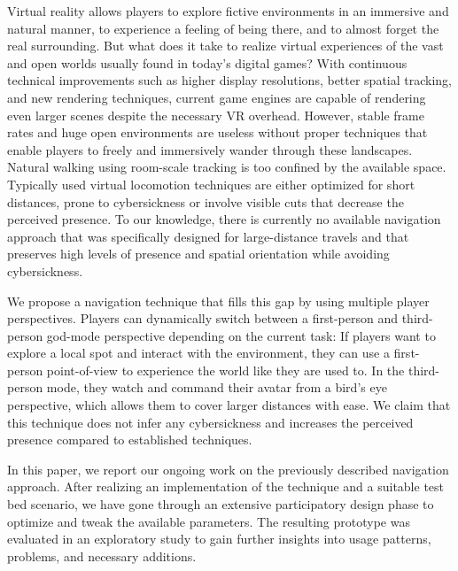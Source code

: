 \documentclass[sigchi-a, authorversion]{acmart}
\newcommand{\comm}[1]{}
\begin{document}
Virtual reality allows players to explore fictive environments in an immersive and natural manner, to experience a feeling of being there, and to almost forget the real surrounding. But what does it take to realize virtual experiences of the vast and open worlds usually found in today's digital games? With continuous technical improvements such as higher display resolutions, better spatial tracking, and new rendering techniques, current game engines are capable of rendering even larger scenes despite the necessary VR overhead. However, stable frame rates and huge open environments are useless without proper techniques that enable players to freely and immersively wander through these landscapes. Natural walking using room-scale tracking is too confined by the available space. Typically used virtual locomotion techniques are either optimized for short distances, prone to cybersickness or involve visible cuts that decrease the perceived presence. To our knowledge, there is currently no available navigation approach that was specifically designed for large-distance travels and that preserves high levels of presence and spatial orientation while avoiding cybersickness.\par
We propose a navigation technique that fills this gap by using multiple player perspectives. Players can dynamically switch between a first-person and third-person god-mode perspective depending on the current task: If players want to explore a local spot and interact with the environment, they can use a first-person point-of-view to experience the world like they are used to. In the third-person mode, they watch and command their avatar from a bird's eye perspective, which allows them to cover larger distances with ease. We claim that this technique does not infer any cybersickness and increases the perceived presence compared to established techniques.\par In this paper, we report our ongoing work on the previously described navigation approach. After realizing an implementation of the technique and a suitable test bed scenario, we have gone through an extensive participatory design phase to optimize and tweak the available parameters. The resulting prototype was evaluated in an exploratory study to gain further insights into usage patterns, problems, and necessary additions. \comm{Backed by our evaluation, we propose a number of application possibilities and discuss the related benefits and drawbacks.}
\end{document}
